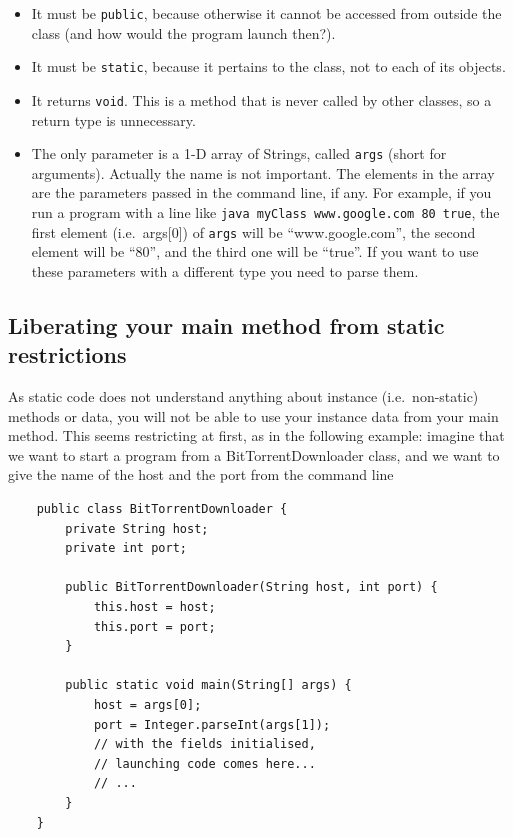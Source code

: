 \begin{itemize}
\item It must be \verb+public+, because otherwise it cannot be
  accessed from outside the class (and how would the program launch
  then?).
\item It must be \verb+static+, because it pertains to the class, not
  to each of its objects.
\item It returns \verb+void+. This is a method that is never called by
  other classes, so a return type is unnecessary.
\item The only parameter is a 1-D array of Strings, called \verb+args+
  (short for arguments). Actually the name is not important. The
  elements in the array are the parameters passed in the command line,
  if any. For example, if you run a program with a line like
  \verb+java myClass www.google.com 80 true+, the first element
  (i.e.~args[0]) of \verb+args+ will be ``www.google.com'', the second
  element will be ``80'', and the third one will be ``true''. If you
  want to use these parameters with a different type you need to parse
  them. 
\end{itemize}

\subsection{Liberating your main method from static restrictions}
\label{sec:liber-your-launch}

As static code does not understand anything about instance
(i.e.~non-static) methods or data, you will not be able to use your
instance data from your main method. This seems restricting at first,
as in the following example: imagine that we want to start a program
from a BitTorrentDownloader class, and we want to give the name of the
host and the port from the command line

\begin{verbatim}
    public class BitTorrentDownloader {
        private String host;
        private int port;
    
        public BitTorrentDownloader(String host, int port) {
            this.host = host;
            this.port = port;
        }
    
        public static void main(String[] args) {
            host = args[0];
            port = Integer.parseInt(args[1]);
            // with the fields initialised, 
            // launching code comes here...
            // ...
        }
    }
\end{verbatim}

